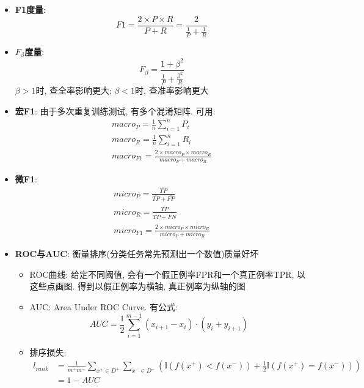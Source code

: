\documentclass[UTF8]{article}
\begin{document}
\begin{itemize}
\begin{itemize}
\begin{minipage}{0.5\linewidth}
		\end{minipage}
	\item \textbf{F1度量}:$$F1=\frac{2\times P\times R}{P+R}=\frac{2}{\frac{1}{P}+\frac{1}{R}}$$
	\item \textbf{$F_\beta$度量}:$$F_\beta=\frac{1+\beta^2}{\frac{1}{P}+\frac{\beta^2}{R}}$$
		$\beta>1$时, 查全率影响更大; $\beta<1$时, 查准率影响更大
	\item \textbf{宏F1}: 由于多次重复训练测试, 有多个混淆矩阵. 可用:
		$$\begin{array}{c}
		macro_P=\frac{1}{n}\sum\limits_{i=1}^nP_i\\
		macro_R=\frac{1}{n}\sum\limits_{i=1}^nR_i\\
		macro_{F1}=\frac{2\times macro_P\times macro_R}{macro_P+macro_R}
		\end{array}$$
	\item \textbf{微F1}:
		$$\begin{array}{c}
		micro_P=\frac{\bar{TP}}{\bar{TP}+\bar{FP}}\\
		micro_R=\frac{\bar{TP}}{\bar{TP}+\bar{FN}}\\
		micro_{F1}=\frac{2\times micro_P\times micro_R}{micro_P+micro_R}
		\end{array}$$
	\item \textbf{ROC与AUC}: 衡量排序(分类任务常先预测出一个数值)质量好坏
		\begin{itemize}
		\item ROC曲线: 给定不同阈值, 会有一个假正例率FPR和一个真正例率TPR, 以这些点画图. 得到以假正例率为横轴, 真正例率为纵轴的图
		\item AUC: Area Under ROC Curve. 有公式:$$AUC=\frac{1}{2}\sum\limits_{i=1}^{m-1}(x_{i+1}-x_i)\cdot(y_i+y_{i+1})$$
		\item 排序损失:
			\begin{align*}
			l_{rank}&=\frac{1}{m^+m^-}\sum\limits_{x^+\in D^+}\sum\limits_{x^-\in D^-}\left(\mathbb{I}(f(x^+)<f(x^-))+\frac{1}{2}\mathbb{I}(f(x^+)=f(x^-))\right)\\
			&=1-AUC
			\end{align*}
		\end{itemize}

\end{itemize}
\end{itemize}
\end{document}
